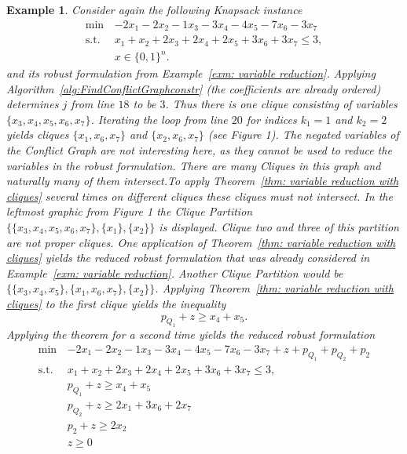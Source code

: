 \documentclass[titlepage, a4paper]{amsbook}
\theoremstyle{plain}
\theoremstyle{break}
\newtheorem{exm}[thm]{Example}
\theoremstyle{definition}
\theoremstyle{remark}
\numberwithin{equation}{thm}
\begin{document}
\begin{exm}\label{exm: Clique Partitions in Conflict Graph}
Consider again the following Knapsack instance
\begin{equation*}
\begin{split}
    \min\, &-2x_1-2x_2-1x_3-3x_4-4x_5-7x_6-3x_7 \\
    \text{s.t. } &x_1+x_2+2x_3+2x_4+2x_5+3x_6+3x_7 \leq 3, \\
    &x \in \{0,1\}^n.
\end{split}
\end{equation*} and its robust formulation from Example~\ref{exm: variable reduction}.
Applying Algorithm~\ref{alg:FindConflictGraphconstr} (the coefficients are already ordered) determines $j$ from line $18$ to be $3$. Thus there is one clique consisting of variables $\{x_3,x_4,x_5,x_6,x_7\}$. Iterating the loop from line $20$ for indices $k_1=1$ and $k_2=2$ yields cliques $\{x_1,x_6,x_7\}$ and $\{x_2,x_6,x_7\}$ (see Figure 1). The negated variables of the Conflict Graph are not interesting here, as they cannot be used to reduce the variables in the robust formulation. There are many Cliques in this graph and naturally many of them intersect.To apply Theorem~\ref{thm: variable reduction with cliques} several times on different cliques these cliques must not intersect. In the leftmost graphic from Figure 1 the Clique Partition $\{\{x_3,x_4,x_5,x_6,x_7\}, \{x_1\}, \{x_2\}\}$ is displayed. Clique two and three of this partition are not proper cliques. One application of Theorem~\ref{thm: variable reduction with cliques} yields the reduced robust formulation that was already considered in Example~\ref{exm: variable reduction}.
Another Clique Partition would be $\{\{x_3,x_4,x_5\}, \{x_1,x_6,x_7\}, \{x_2\}\}$. Applying Theorem~\ref{thm: variable reduction with cliques} to the first clique yields the inequality
\[p_{Q_1} + z \geq x_4 + x_5.\]
Applying the theorem for a second time yields the reduced robust formulation
\begin{equation*}
\begin{split}
    \min\, &-2x_1-2x_2-1x_3-3x_4-4x_5-7x_6-3x_7 + z + p_{Q_1} + p_{Q_2} +p_2\\
    \text{s.t. } &x_1+x_2+2x_3+2x_4+2x_5+3x_6+3x_7 \leq 3, \\
    &p_{Q_1} + z \geq x_4 + x_5 \\
    &p_{Q_2} + z \geq 2x_1 + 3x_6+ 2x_7 \\
    &p_2 + z \geq 2x_2 \\
    &z \geq 0 \\

\end{split}
\end{equation*}
\end{exm}
\end{document}
